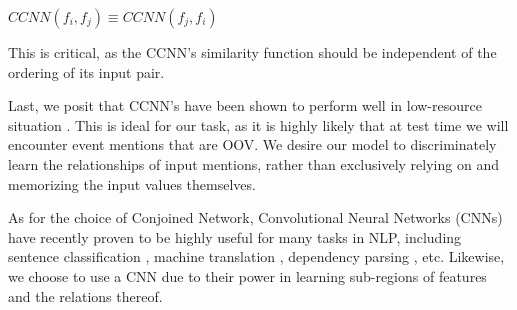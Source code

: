\documentclass[11pt,a4paper]{article}
\begin{document}
\vspace{4mm}

 $CCNN(f_i,f_j) \equiv CCNN(f_j,f_i)$

\vspace{4mm}

This is critical, as the CCNN's similarity function should be independent of the ordering of its input pair.

Last, we posit that CCNN's have been shown to perform well in low-resource situation \cite{Koch2015SiameseNN}.  This is ideal for our task, as it is highly likely that at test time we will encounter event mentions that are OOV.  We desire our model to discriminately learn the relationships of input mentions, rather than exclusively relying on and memorizing the input values themselves.

As for the choice of Conjoined Network, Convolutional Neural Networks (CNNs) have recently proven to be highly useful for many tasks in NLP, including sentence classification \cite{DBLP:conf/emnlp/Kim14}, machine translation \cite{DBLP:conf/acl/GehringAGD17}, dependency parsing \cite{DBLP:journals/corr/YuV17}, etc.  Likewise, we choose to use a CNN due to their power in learning sub-regions of features and the relations thereof.
\end{document}
